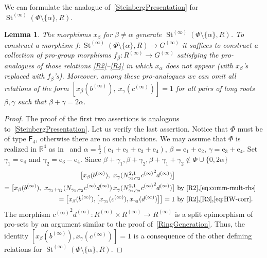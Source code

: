 \documentclass[oneside, 11pt]{amsart}
\numberwithin{equation}{section}
\newtheorem{lemma}{Lemma} \numberwithin{lemma}{section}
\theoremstyle{definition}
\theoremstyle{remark}
\DeclareMathOperator\St{St}
\newcommand{\rF}{\mathsf{F}}
\begin{document}
We can formulate the analogue of~\cref{SteinbergPresentation} for $\St^{(\infty)}(\Phi \setminus \{ \alpha \}, R)$.
\begin{lemma}\label{rem:xpma-presentation}
The morphisms $x_\beta$ for $\beta\neq \alpha$ generate $\St^{(\infty)}(\Phi\setminus\{\alpha\}, R)$. To construct a morphism $f \colon \St^{(\infty)}(\Phi\setminus\{\alpha\}, R) \to G^{(\infty)}$ it suffices to construct a collection of pro-group morphisms $f_\beta \colon R^{(\infty)} \to G^{(\infty)}$ satisfying the pro-analogues of those relations \eqref{R2}--\eqref{R4} in which $x_\alpha$ does not appear (with $x_\beta$'s replaced with $f_\beta$'s). Moreover, among these pro-analogues we can omit all relations of the form $[x_\beta(b^{(\infty)}),\ x_\gamma(c^{(\infty)})] = 1$ for all pairs of long roots \(\beta, \gamma\) such that \(\beta + \gamma = 2\alpha\).
\end{lemma}
\begin{proof}
The proof of the first two assertions is analogous to~\cref{SteinbergPresentation}. Let us verify the last assertion. Notice that \(\Phi\) must be of type $\rF_4$, otherwise there are no such relations. We may assume that $\Phi$ is realized in $\mathbb{R}^4$ as in~\cite[Ch.~VI,\S~4.9]{Bou81} and \(\alpha = \frac{1}{2}(\mathrm e_1 + \mathrm e_2 + \mathrm e_3 + \mathrm e_4)\), \(\beta = \mathrm e_1 + \mathrm e_2\), \(\gamma = \mathrm e_3 + \mathrm e_4\). Set \(\gamma_1 = \mathrm e_4\) and \(\gamma_2 = \mathrm e_3 - \mathrm e_4\). Since \(\beta + \gamma_1, \beta + \gamma_2, \beta + \gamma_1 + \gamma_2 \notin \Phi \cup \{0, 2\alpha\}\)
\begin{align*}
\bigl[x_\beta(b^{(\infty)}),\ x_\gamma(N_{\gamma_1, \gamma_2}^{2, 1} {c^{(\infty)}}^2 d^{(\infty)})\bigr] \\ = \bigl[x_\beta(b^{(\infty)}),\ x_{\gamma_1 + \gamma_2}(N_{\gamma_1, \gamma_2} c^{(\infty)} d^{(\infty)})\, x_\gamma(N_{\gamma_1, \gamma_2}^{2, 1} {c^{(\infty)}}^2 d^{(\infty)})\bigr] & \text{ by~\eqref{R2},\eqref{eq:comm-mult-rhs}}\\
= \bigl[x_\beta(b^{(\infty)}), \bigl[x_{\gamma_1}(c^{(\infty)}), x_{\gamma_2}(d^{(\infty)})\bigr]\bigr] = 1 &\text{ by~\eqref{R2},\eqref{R3},\eqref{eq:HW-corr}}.
\end{align*}
The morphism ${c^{(\infty)}}^2 d^{(\infty)} \colon R^{(\infty)} \times R^{(\infty)} \to R^{(\infty)}$ is a split epimorphism of pro-sets by an argument similar to the proof of~\cref{RingGeneration}. Thus, the identity \([x_\beta(b^{(\infty)}), x_\gamma(c^{(\infty)})] = 1\) is a consequence of the other defining relations for $\St^{(\infty)}(\Phi\setminus\{\alpha\}, R)$.
\end{proof}
\end{document}
